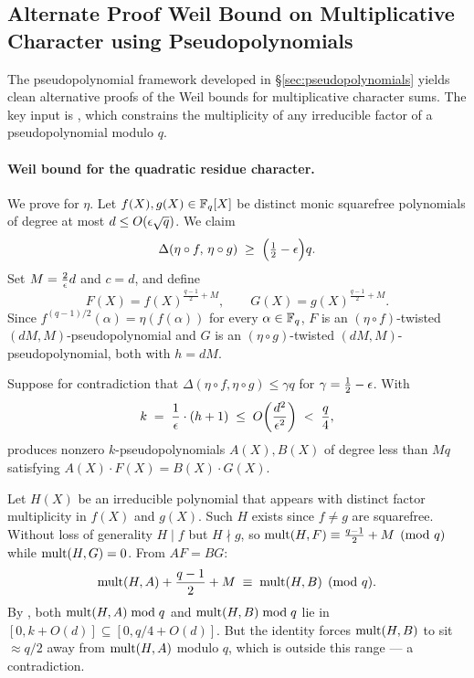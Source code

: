 \subsection{Alternate Proof Weil Bound on Multiplicative Character using Pseudopolynomials}

The pseudopolynomial framework developed in \S\ref{sec:pseudopolynomials} yields clean alternative proofs of the Weil bounds for multiplicative character sums. The key input is \PdegMultBoundlem, which constrains the multiplicity of any irreducible factor of a pseudopolynomial modulo $q$.

\paragraph*{Weil bound for the quadratic residue character.}
We prove \WeilBoundPsiNondthm for $\eta$. Let $f(X), g(X) \in \mathbb{F}_q[X]$ be distinct monic squarefree polynomials of degree at most $d \leq O(\epsilon\sqrt{q})$. We claim
\[
  \Delta(\eta \circ f,\, \eta \circ g) \;\geq\; \Bigl(\tfrac{1}{2} - \epsilon\Bigr)q.
\]
Set $M = \frac{2}{\epsilon}d$ and $c = d$, and define
\[
  F(X) = f(X)^{\frac{q-1}{2}+M}, \qquad G(X) = g(X)^{\frac{q-1}{2}+M}.
\]
Since $f^{(q-1)/2}(\alpha) = \eta(f(\alpha))$ for every $\alpha \in \mathbb{F}_q$, $F$ is an $(\eta\circ f)$-twisted $(dM, M)$-pseudopolynomial and $G$ is an $(\eta\circ g)$-twisted $(dM, M)$-pseudopolynomial, both with $h = dM$.

Suppose for contradiction that $\Delta(\eta\circ f, \eta\circ g) \leq \gamma q$ for $\gamma = \frac{1}{2} - \epsilon$. With
\[
  k \;=\; \frac{1}{\epsilon}\cdot(h+1) \;\leq\; O\!\left(\frac{d^2}{\epsilon^2}\right) \;<\; \frac{q}{4},
\]
\TwistedRobustTwothm produces nonzero $k$-pseudopolynomials $A(X), B(X)$ of degree less than $Mq$ satisfying $A(X)\cdot F(X) = B(X)\cdot G(X)$.

Let $H(X)$ be an irreducible polynomial that appears with distinct factor multiplicity in $f(X)$ and $g(X)$. Such $H$ exists since $f \neq g$ are squarefree. Without loss of generality $H \mid f$ but $H \nmid g$, so $\operatorname{mult}(H, F) \equiv \frac{q-1}{2} + M \pmod{q}$ while $\operatorname{mult}(H, G) = 0$. From $AF = BG$:
\[
  \operatorname{mult}(H, A) + \frac{q-1}{2} + M \;\equiv\; \operatorname{mult}(H, B) \pmod{q}.
\]
By \PdegMultBoundlem, both $\operatorname{mult}(H, A) \bmod q$ and $\operatorname{mult}(H, B) \bmod q$ lie in $[0, k + O(d)] \subseteq [0, q/4 + O(d)]$. But the identity forces $\operatorname{mult}(H, B)$ to sit $\approx q/2$ away from $\operatorname{mult}(H, A)$ modulo $q$, which is outside this range — a contradiction.

